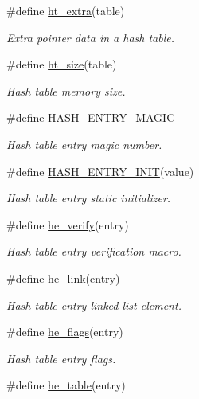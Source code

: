 \begin{CompactItemize}
\#define \hyperlink{group__dbprim__hash_ga34}{ht\_\-extra}(table)
\begin{CompactList}\small\item\em Extra pointer data in a hash table. \item\end{CompactList}\item 
\#define \hyperlink{group__dbprim__hash_ga35}{ht\_\-size}(table)
\begin{CompactList}\small\item\em Hash table memory size. \item\end{CompactList}\item 
\#define \hyperlink{group__dbprim__hash_ga36}{HASH\_\-ENTRY\_\-MAGIC}
\begin{CompactList}\small\item\em Hash table entry magic number. \item\end{CompactList}\item 
\#define \hyperlink{group__dbprim__hash_ga37}{HASH\_\-ENTRY\_\-INIT}(value)
\begin{CompactList}\small\item\em Hash table entry static initializer. \item\end{CompactList}\item 
\#define \hyperlink{group__dbprim__hash_ga38}{he\_\-verify}(entry)
\begin{CompactList}\small\item\em Hash table entry verification macro. \item\end{CompactList}\item 
\#define \hyperlink{group__dbprim__hash_ga39}{he\_\-link}(entry)
\begin{CompactList}\small\item\em Hash table entry linked list element. \item\end{CompactList}\item 
\#define \hyperlink{group__dbprim__hash_ga40}{he\_\-flags}(entry)
\begin{CompactList}\small\item\em Hash table entry flags. \item\end{CompactList}\item 
\#define \hyperlink{group__dbprim__hash_ga41}{he\_\-table}(entry)

\end{CompactItemize}
